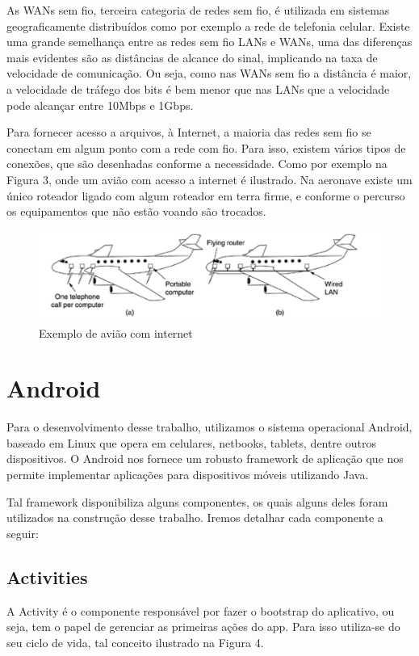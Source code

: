 \documentclass[12pt, %
openright, 
oneside,
a4paper,
brazil]{facom-ufu-abntex2}
\begin{document}
As WANs sem fio, terceira categoria de redes sem fio, é utilizada em sistemas geograficamente distribuídos como por exemplo a rede de telefonia celular. Existe uma grande semelhança entre as redes sem fio LANs e WANs, uma das diferenças mais evidentes são as distâncias de alcance do sinal, implicando na taxa de velocidade de comunicação. Ou seja, como nas WANs sem fio a distância é maior, a velocidade de tráfego dos bits é bem menor que nas LANs que a velocidade pode alcançar entre 10Mbps e 1Gbps.

Para fornecer acesso a arquivos, à Internet, a maioria das redes sem fio se conectam em algum ponto com a rede com fio. Para isso, existem vários tipos de conexões, que são desenhadas conforme a necessidade. Como por exemplo na Figura 3, onde um avião com acesso a internet é ilustrado. Na aeronave existe um único roteador ligado com algum roteador em terra firme, e conforme o percurso os equipamentos  que não estão voando são trocados.

\begin{figure}[hbt]
  \includegraphics[scale=0.9]{aviao}
  \caption{Exemplo de avião com internet \cite{tanenbaum2003redes}}
\end{figure}



\section{Android}

	Para o desenvolvimento desse trabalho, utilizamos o sistema operacional Android, baseado em Linux que opera em celulares, netbooks, tablets, dentre outros dispositivos. O Android nos fornece um robusto framework de aplicação que nos permite implementar aplicações para dispositivos móveis utilizando Java.
	

	Tal framework disponibiliza alguns componentes, os quais alguns deles foram utilizados na construção desse trabalho.
	Iremos detalhar cada componente a seguir:
	\cite{googleand}
	
	\subsection{Activities}
	A Activity é o componente responsável por fazer o bootstrap do aplicativo, ou seja, tem o papel de gerenciar as primeiras ações do app. Para isso utiliza-se do seu ciclo de vida, tal conceito ilustrado na Figura 4.\
	
\end{document}
